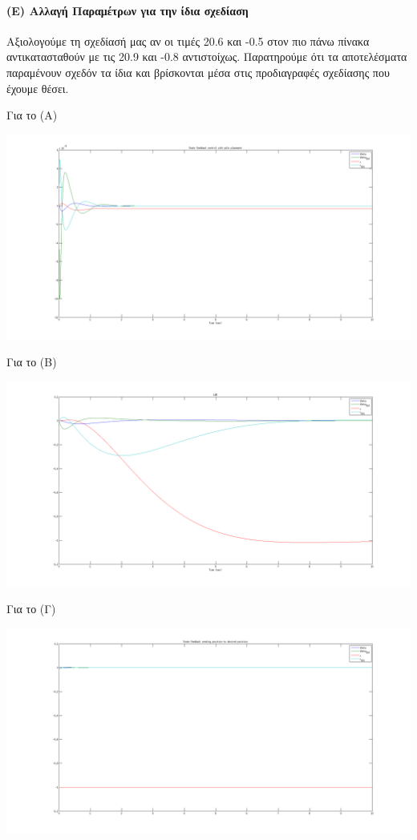 \documentclass[a4paper,oneside, 12pt]{article}
\begin{document}
\paragraph{(Ε) Αλλαγή Παραμέτρων για την ίδια σχεδίαση} Αξιολογούμε τη σχεδίασή μας αν οι τιμές 20.6 και  -0.5 στον πιο πάνω πίνακα αντικατασταθούν με τις 20.9 και -0.8 αντιστοίχως. Παρατηρούμε ότι τα αποτελέσματα παραμένουν σχεδόν τα ίδια και βρίσκονται μέσα στις προδιαγραφές σχεδίασης που έχουμε θέσει. 

Για το (A)

\includegraphics[width=\textwidth]{E1.png}

Για το (Β)

\includegraphics[width=\textwidth]{E2.png}

Για το (Γ)

\includegraphics[width=\textwidth]{E3.png}
\end{document}
